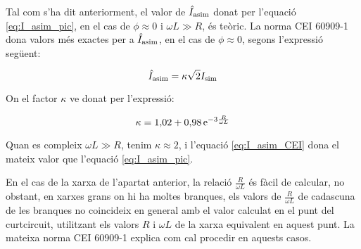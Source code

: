 Tal com s'ha dit anteriorment, el valor de $\hat{I}_\mathrm{asim}$ donat per l'equació \eqref{eq:I_asim_pic}, en el cas de $\phi \approx 0$ i $\omega L\gg R$, és teòric. La norma CEI 60909-1 dona valors més exactes per a $\hat{I}_\mathrm{asim}$, en el cas de $\phi \approx 0$, segons l'expressió següent:

\begin{equation}
    \hat{I}_\mathrm{asim} = \kappa \sqrt{2} I_\mathrm{sim} \label{eq:I_asim_CEI}
\end{equation}

On el factor $\kappa$ ve donat per l'expressió:

\begin{equation}
    \kappa = 1{,}02 + 0{,}98 \,\mathrm{e}^{-3\frac{R}{\omega L}}\label{eq:kappa_CEI}
\end{equation}

Quan es compleix $\omega L\gg R$, tenim $\kappa \approx 2$, i l'equació \eqref{eq:I_asim_CEI} dona el mateix valor que l'equació \eqref{eq:I_asim_pic}.

En el cas de la xarxa de l'apartat anterior, la relació $\frac{R}{\omega L}$ és fàcil de  calcular, no obstant, en xarxes grans on hi ha moltes branques, els valors de $\frac{R}{\omega L}$ de cadascuna de les branques no coincideix en general amb el valor calculat en el punt del curtcircuit, utilitzant els valors $R$ i $\omega L$ de la xarxa equivalent en aquest punt. La mateixa norma CEI 60909-1 explica com cal procedir en aquests casos.


